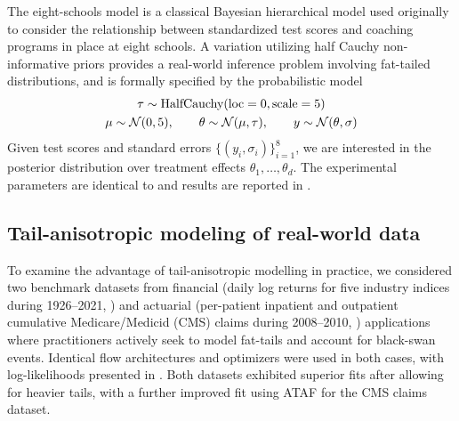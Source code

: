 \documentclass[twoside]{article}
\theoremstyle{definition}
\theoremstyle{remark}
\begin{document}
The eight-schools model \citep{rubin1981estimation,gelman2013bayesian} is a classical
Bayesian hierarchical model used originally to consider the relationship between standardized
test scores and coaching programs in place at eight schools.
A variation utilizing half Cauchy non-informative priors \citep{gelman2006prior} provides
a real-world inference problem involving fat-tailed distributions, and is formally specified
by the probabilistic model
\begin{gather*}
    \tau \sim \text{HalfCauchy}(\text{loc}=0, \text{scale}=5)\\
    \mu \sim \mathcal{N}(0, 5),\qquad
    \theta \sim \mathcal{N}(\mu, \tau),\qquad
    y \sim \mathcal{N}(\theta, \sigma)
\end{gather*}
Given test scores and standard errors $\{(y_i, \sigma_i)\}_{i=1}^8$, we are interested in the
posterior distribution over treatment effects $\theta_1,\ldots,\theta_d$. The experimental
parameters are identical to  and results are reported in .


\subsection{Tail-anisotropic modeling of real-world data}

To examine the advantage of tail-anisotropic modelling in practice, we considered two benchmark datasets from financial (daily log returns for five industry indices during 1926--2021, \cite{fama2015five}) and actuarial (per-patient inpatient and outpatient cumulative Medicare/Medicid (CMS) claims during 2008--2010, \cite{cms}) applications where practitioners actively seek to model fat-tails and account for black-swan events. Identical flow architectures and optimizers were used in both cases, with log-likelihoods presented in . Both datasets exhibited superior fits after allowing for heavier tails, with a further improved fit using ATAF for the CMS claims dataset. 



\end{document}
